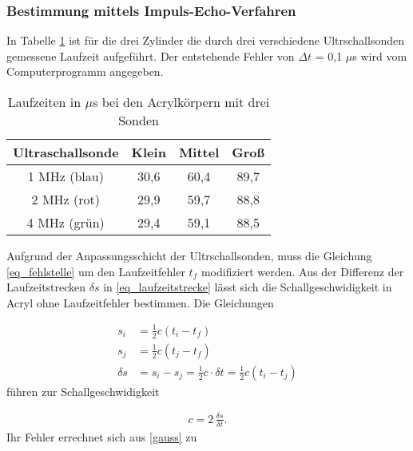 \subsubsection{Bestimmung mittels Impuls-Echo-Verfahren}
In Tabelle \ref{tab_impulsecho} ist für die drei Zylinder die durch drei verschiedene Ultrschallsonden gemessene Laufzeit aufgeführt. Der
entstehende Fehler von $\Delta t$ = 0,1 $\mu$s wird vom Computerprogramm angegeben.

\begin{table}[H]
 \begin{tabular}{c|c|c|c}
 Ultraschallsonde & Klein & Mittel & Groß\\
 \hline
1 MHz (blau)&	30,6&	60,4&	89,7\\
2 MHz (rot)&	29,9&	59,7&	88,8\\
4 MHz (grün)&	29,4&	59,1&	88,5\\  
 \end{tabular}
\caption{Laufzeiten in $\mu$s bei den Acrylkörpern mit drei Sonden}
\label{tab_impulsecho}
\end{table}

Aufgrund der Anpassungsschicht der Ultrschallsonden, muss die Gleichung \eqref{eq_fehlstelle} um den Laufzeitfehler $t_f$ modifiziert werden.
Aus der Differenz der Laufzeitstrecken $\delta s$ in \eqref{eq_laufzeitstrecke} lässt sich die Schallgeschwidigkeit in Acryl ohne 
Laufzeitfehler bestimmen. Die Gleichungen

\begin{align}
\label{eq_laufzeitfehler}
 s_i &= \frac12 c (t_i - t_f)\\
 \nonumber
 s_j &= \frac12 c (t_j - t_f)\\
 \delta s &= s_i - s_j = \frac12 c \cdot  \delta t = \frac12 c (t_i - t_j)
 \label{eq_laufzeitstrecke}
\end{align}
führen zur Schallgeschwidigkeit

\begin{align}
 c = 2\, \frac{\delta s}{\delta t}.
\end{align}
Ihr Fehler errechnet sich aus \eqref{gauss} zu

